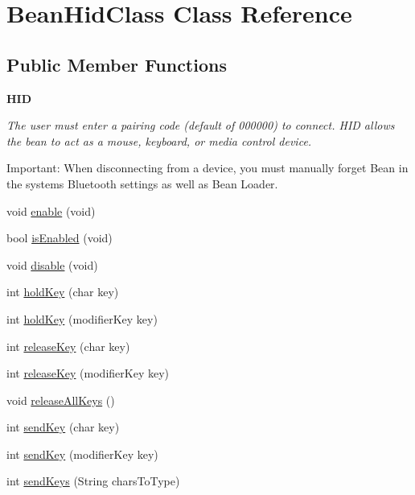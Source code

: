 \hypertarget{class_bean_hid_class}{}\section{Bean\+Hid\+Class Class Reference}
\label{class_bean_hid_class}
\subsection*{Public Member Functions}
\begin{Indent}{\bf H\+I\+D}\par
{\em The user must enter a pairing code (default of 000000) to connect. H\+I\+D allows the bean to act as a mouse, keyboard, or media control device.

Important\+: When disconnecting from a device, you must manually forget Bean in the system\textquotesingle{}s Bluetooth settings as well as Bean Loader. }\begin{DoxyCompactItemize}
\item 
void \hyperlink{class_bean_hid_class_a13765378242667b5be0cd50ae2da2afd}{enable} (void)
\item 
bool \hyperlink{class_bean_hid_class_afd8c0eec7e3104ae14cd538e954d8306}{is\+Enabled} (void)
\item 
void \hyperlink{class_bean_hid_class_afa5abdeac9960f5461b78efa58880abf}{disable} (void)
\item 
int \hyperlink{class_bean_hid_class_a5e80e1a866e97a27ee57e9361864aa01}{hold\+Key} (char key)
\item 
int \hyperlink{class_bean_hid_class_aa32f0b43c31a36450899b84e13cfb18c}{hold\+Key} (modifier\+Key key)
\item 
int \hyperlink{class_bean_hid_class_aa55a6740f7eb7586a02acc4e285308d1}{release\+Key} (char key)
\item 
int \hyperlink{class_bean_hid_class_a776d559506390cb3ee9068cfdbfe78f3}{release\+Key} (modifier\+Key key)
\item 
void \hyperlink{class_bean_hid_class_a0301c3d8352555b033cc1499c8660ddb}{release\+All\+Keys} ()
\item 
int \hyperlink{class_bean_hid_class_adba60b7a4ff098727a0df2afa2ee5b97}{send\+Key} (char key)
\item 
int \hyperlink{class_bean_hid_class_a9608d4e79b947b2f43209edcfe874a6a}{send\+Key} (modifier\+Key key)
\item 
int \hyperlink{class_bean_hid_class_a89d770aed9c9e5fb66ce5fd33889c328}{send\+Keys} (String chars\+To\+Type)

\end{DoxyCompactItemize}
\end{Indent}
